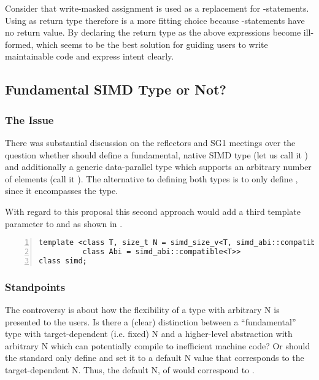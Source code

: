 Consider that write-masked assignment is used as a replacement for -statements.
Using \void as return type therefore is a more fitting choice because -statements have no return value.
By declaring the return type as \void the above expressions become ill-formed, which seems to be the best solution for guiding users to write maintainable code and express intent clearly.

\subsection{Fundamental SIMD Type or Not?}
\subsubsection{The Issue}
There was substantial discussion on the reflectors and SG1 meetings over the question whether \CC{} should define a fundamental, native SIMD type (let us call it ) and additionally a generic data-parallel type which supports an arbitrary number of elements (call it ).
The alternative to defining both types is to only define , since it encompasses the  type.

With regard to this proposal this second approach would add a third template parameter to \simd and \mask as shown in .
\begin{lstlisting}[style=Vc,numbers=left,float,label=lst:simd N,caption={
  Possible declaration of the class template parameters of a \simd class with arbitrary width.
}]
template <class T, size_t N = simd_size_v<T, simd_abi::compatible<T>>,
          class Abi = simd_abi::compatible<T>>
class simd;
\end{lstlisting}

\subsubsection{Standpoints}
The controversy is about how the flexibility of a type with arbitrary \code N is presented to the users.
Is there a (clear) distinction between a “fundamental” type with target-dependent (i.e. fixed) \code N and a higher-level abstraction with arbitrary \code N which can potentially compile to inefficient machine code?
Or should the \CC{} standard only define  and set it to a default \code N value that corresponds to the target-dependent \code N.
Thus, the default \code N, of  would correspond to .

